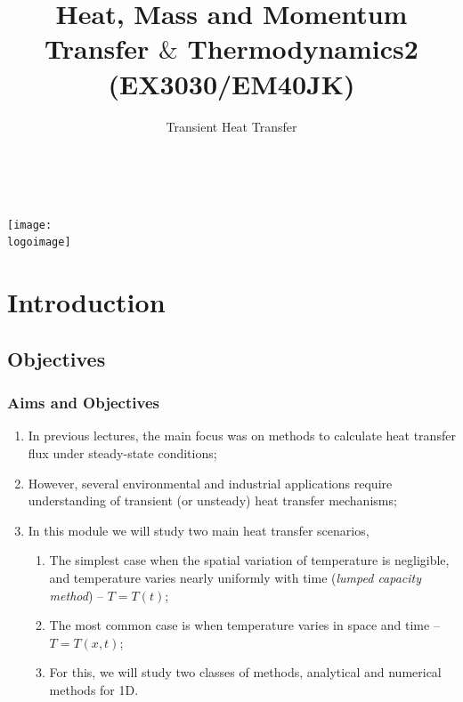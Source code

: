 \documentclass[10pt,compress]{beamer}
\institute{School of Engineering}
\title{Heat, Mass and Momentum Transfer $\&$ Thermodynamics2 (EX3030/EM40JK)}
\subtitle{Transient Heat Transfer}
\date[ ]{ }
\author[\shortname]{%
  \fullname\\\ttfamily{\emailaddress}
}
\newcommand{\logoimage}{../FigBanner/UoAHorizBanner}
\begin{document}
\begin{frame}
  \titlepage
  \vfill%
  \begin{center}
    \texttt{[image: \\logoimage]}
  \end{center}
\end{frame}




\section{Introduction} 


\subsection{Objectives}

\begin{frame}
 \frametitle{Aims and Objectives}
   \begin{enumerate}
     \item<1-> In previous lectures, the main focus was on methods to calculate heat transfer flux under steady-state conditions;
     \item<1-> However, several environmental and industrial applications require understanding of transient (or unsteady) heat transfer mechanisms;
     \item<2-> In this module we will study two main heat transfer scenarios,
         \begin{enumerate}
            \item<2-> The simplest case when the spatial variation of temperature is negligible, and temperature varies nearly uniformly with time ({\it lumped capacity method}) -- $T=T\left(t\right)$;
            \item<3-> The most common case is when temperature varies in space and time -- $T=T\left(x, t\right)$;
            \item<3-> For this, we will study two classes of methods, analytical and numerical methods for 1D. 
         \end{enumerate}
   \end{enumerate}
\end{frame}
\end{document}
